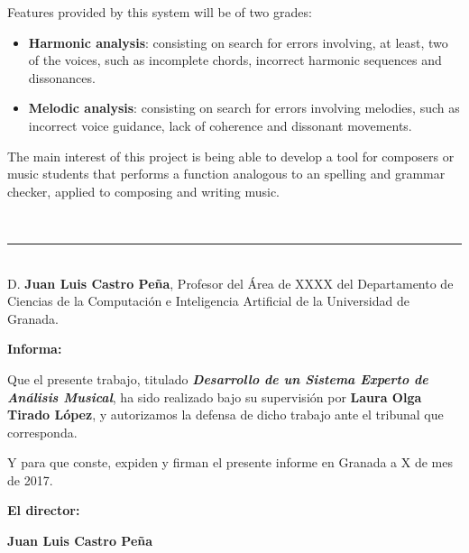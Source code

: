 \documentclass[a4paper, 12pt]{report} %
\numberwithin{equation}{section} %
\numberwithin{figure}{section} %
\numberwithin{table}{section} %
\begin{document}
\bigskip

Features provided by this system will be of two grades:

\begin{itemize}
	\item \textbf{Harmonic analysis}: consisting on search for errors involving, at least, two of the voices, such as incomplete chords, incorrect harmonic sequences and dissonances.
	\item  \textbf{Melodic analysis}: consisting on search for errors involving melodies, such as incorrect voice guidance, lack of coherence and dissonant movements. 
\end{itemize}

\bigskip

The main interest of this project is being able to develop a tool for composers or music students that performs a function analogous to an spelling and grammar checker, applied to composing and writing music. 

\newpage
\thispagestyle{empty}
\

\noindent\rule[-1ex]{\textwidth}{2pt}\\[4.5ex]

D. \textbf{Juan Luis Castro Peña}, Profesor del Área de XXXX del Departamento de Ciencias de la Computación e Inteligencia Artificial de la Universidad de Granada.

\vspace{0.5cm}

\textbf{Informa:}

\vspace{0.5cm}

Que el presente trabajo, titulado \textit{\textbf{Desarrollo de un Sistema Experto de Análisis Musical}},
ha sido realizado bajo su supervisión por \textbf{Laura Olga Tirado López}, y autorizamos la defensa de dicho trabajo ante el tribunal que corresponda.

\vspace{0.5cm}

Y para que conste, expiden y firman el presente informe en Granada a X de mes de 2017.

\vspace{1cm}

\textbf{El director:}

\vspace{5cm}

\noindent \textbf{Juan Luis Castro Peña}

\newpage
\thispagestyle{empty}
\
\end{document}
